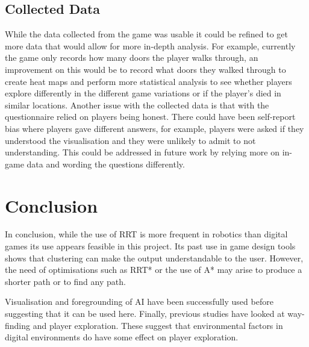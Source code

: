 \documentclass[journal]{IEEEtran}
\begin{document}
	\subsection{Collected Data}    
	While the data collected from the game was usable it could be refined to get more data that would allow for more in-depth analysis. For example, currently the game only records how many doors the player walks through, an improvement on this would be to record what doors they walked through to create heat maps and perform more statistical analysis to see whether players explore differently in the different game variations or if the player's died in similar locations.
	Another issue with the collected data is that with the questionnaire relied on players being honest. There could have been self-report bias where players gave different answers, for example, players were asked if they understood the visualisation and they were unlikely to admit to not understanding. This could be addressed in future work by relying more on in-game data and wording the questions differently.
	
	\section{Conclusion} 
	In conclusion, while the use of RRT is more frequent in robotics than digital games its use appears feasible in this project. Its past use in game design tools shows that clustering can make the output understandable to the user. However, the need of optimisations such as RRT* or the use of A* may arise to produce a shorter path or to find any path. 
	
	Visualisation and foregrounding of AI have been successfully used before suggesting that it can be used here. Finally, previous studies have looked at way-finding and player exploration. These suggest that environmental factors in digital environments do have some effect on player exploration.
	
	
	
	
	
	\appendices
	
	
	
\end{document}
